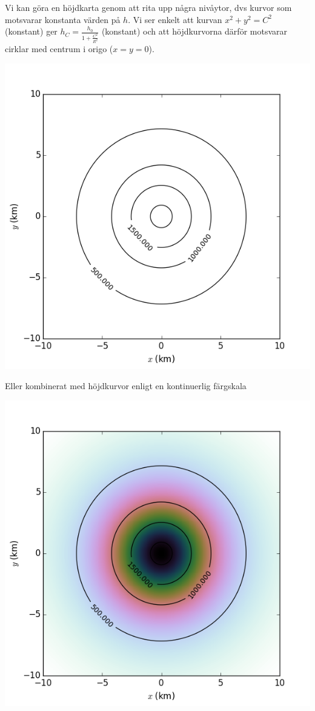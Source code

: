 \documentclass[%
oneside,                 %
final,                   %
10pt]{article}
\begin{document}
\vspace{6mm}



Vi kan göra en höjdkarta genom att rita upp några nivåytor, dvs kurvor som motsvarar konstanta värden på $h$. Vi ser enkelt att kurvan $x^2 + y^2 = C^2$ (konstant) ger $h_C = \frac{h_0}{1+\frac{C^2}{R^2}}$ (konstant) och att höjdkurvorna därför motsvarar cirklar med centrum i origo ($x=y=0$).




\vspace{6mm}

\centerline{\includegraphics[width=0.8\linewidth]{fig/hojd_contour.png}}

\vspace{6mm}



Eller kombinerat med höjdkurvor enligt en kontinuerlig färgskala



\vspace{6mm}

\centerline{\includegraphics[width=0.8\linewidth]{fig/hojd_contour_colormesh.png}}
\end{document}
